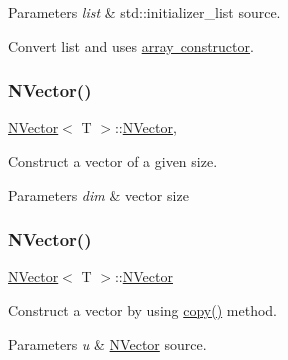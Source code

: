 \begin{DoxyParams}{Parameters}
{\em list} & {\ttfamily std\+::initializer\+\_\+list} source.\\
\hline
\end{DoxyParams}
Convert {\ttfamily list} and uses \mbox{\hyperlink{class_n_vector}{array constructor}}. \mbox{\label{class_vector3_a58eee5f012e4e563d477788051fc7f1d}} 
\subsubsection{\texorpdfstring{NVector()}{NVector()}\hspace{0.1cm}{\footnotesize\ttfamily [3/5]}}
{\footnotesize\ttfamily \mbox{\hyperlink{class_n_vector}{N\+Vector}}$<$ T $>$\+::\mbox{\hyperlink{class_n_vector}{N\+Vector}}\hspace{0.3cm}{\ttfamily [inline]}, {\ttfamily [explicit]}}



Construct a vector of a given size. 


\begin{DoxyParams}{Parameters}
{\em dim} & vector size \\
\hline
\end{DoxyParams}
\mbox{\label{class_vector3_a7f648402b0fc9006ce9ced7ca647e600}} 
\subsubsection{\texorpdfstring{NVector()}{NVector()}\hspace{0.1cm}{\footnotesize\ttfamily [4/5]}}
{\footnotesize\ttfamily \mbox{\hyperlink{class_n_vector}{N\+Vector}}$<$ T $>$\+::\mbox{\hyperlink{class_n_vector}{N\+Vector}}\hspace{0.3cm}{\ttfamily [inline]}}



Construct a vector by using {\ttfamily \mbox{\hyperlink{class_n_vector_a67128d2ff536b8ccd7a95cb680bd0431}{copy()}}} method. 


\begin{DoxyParams}{Parameters}
{\em u} & {\ttfamily \mbox{\hyperlink{class_n_vector}{N\+Vector}}} source. \\
\hline
\end{DoxyParams}
\mbox{\label{class_vector3_a402111a5a467efd5741e6a17fbd5c903}} 
